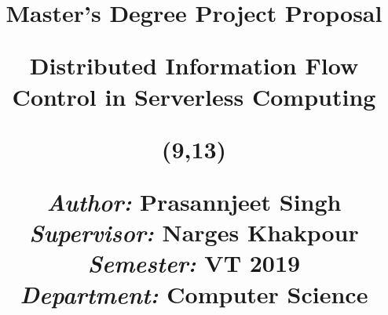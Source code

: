 \title{	
	\vspace{-8cm}
	\begin{sidebar}
		\vspace{10cm}
		\normalfont \normalsize
		\Huge Master's Degree Project Proposal \\
		\vspace{-1.3cm}
	\end{sidebar}
	\vspace{3cm}
	\begin{flushleft}
		\huge Distributed Information Flow Control in Serverless Computing\\ 
	\end{flushleft}
	\null
	\vfill
	\begin{textblock}{6}(9,13)
		\begin{flushright}
			\begin{minipage}{\textwidth}
				\begin{flushleft} \large
					\emph{Author:} Prasannjeet Singh\\ %
					\emph{Supervisor:} Narges Khakpour\\ %
					\emph{Semester:} VT 2019\\ %
					\emph{Department:} Computer Science\\ %
				\end{flushleft}
			\end{minipage}
		\end{flushright}
	\end{textblock}
}

\date{} 